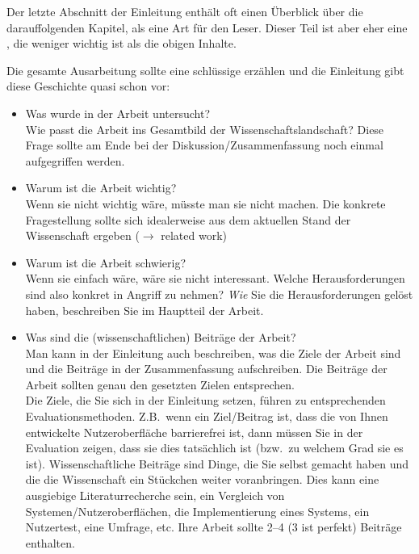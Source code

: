 Der letzte Abschnitt der Einleitung enthält oft einen Überblick über die darauffolgenden Kapitel, als eine Art  für den Leser. Dieser Teil ist aber eher eine , die weniger wichtig ist als die obigen Inhalte.

Die gesamte Ausarbeitung sollte eine schlüssige  erzählen und die Einleitung gibt diese Geschichte quasi schon vor:
\begin{itemize}
  \item Was wurde in der Arbeit untersucht?\\
  Wie passt die Arbeit ins Gesamtbild der Wissenschaftslandschaft? Diese Frage sollte am Ende bei der Diskussion/Zusammenfassung noch einmal aufgegriffen werden.
  \item Warum ist die Arbeit wichtig?\\
  Wenn sie nicht wichtig wäre, müsste man sie nicht machen. Die konkrete Fragestellung sollte sich idealerweise aus dem aktuellen Stand der Wissenschaft ergeben ($\rightarrow$ related work)
  \item Warum ist die Arbeit schwierig?\\
  Wenn sie einfach wäre, wäre sie nicht interessant. Welche Herausforderungen sind also konkret in Angriff zu nehmen? \emph{Wie} Sie die Herausforderungen gelöst haben, beschreiben Sie im Hauptteil der Arbeit.
  \item Was sind die (wissenschaftlichen) Beiträge der Arbeit?\\
  Man kann in der Einleitung auch beschreiben, was die Ziele der Arbeit sind und die Beiträge in der Zusammenfassung aufschreiben. Die Beiträge der Arbeit sollten genau den gesetzten Zielen entsprechen.\\
  Die Ziele, die Sie sich in der Einleitung setzen, führen zu entsprechenden Evaluationsmethoden. Z.B.\ wenn ein Ziel/Beitrag ist, dass die von Ihnen entwickelte Nutzeroberfläche barrierefrei ist, dann müssen Sie in der Evaluation zeigen, dass sie dies tatsächlich ist (bzw.\ zu welchem Grad sie es ist). Wissenschaftliche Beiträge sind Dinge, die Sie selbst gemacht haben und die die Wissenschaft ein Stückchen weiter voranbringen. Dies kann eine ausgiebige Literaturrecherche sein, ein Vergleich von Systemen/Nutzeroberflächen, die Implementierung eines Systems, ein Nutzertest, eine Umfrage, etc. Ihre Arbeit sollte 2--4 (3 ist perfekt) Beiträge enthalten.
\end{itemize}
